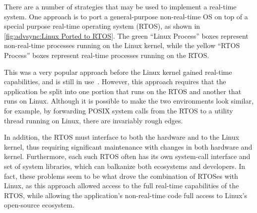 There are a number of strategies that may be used to implement a
real-time system.
One approach is to port a general-purpose non-real-time OS on top
of a special purpose real-time operating system (RTOS), as shown in
\cref{fig:advsync:Linux Ported to RTOS}.
The green ``Linux Process'' boxes represent non-real-time processes
running on the Linux kernel, while the yellow ``RTOS Process''
boxes represent real-time processes running on the RTOS\@.

This was a very popular approach before the Linux kernel gained
real-time capabilities, and is still in
use~\cite{Xenomai2014,VictorYodaiken2004a}.
However, this approach requires that the application be split into
one portion that runs on the RTOS and another that runs on Linux.
Although it is possible to make the two environments look similar,
for example, by forwarding POSIX system calls from the RTOS to a
utility thread running on Linux, there are invariably rough edges.

In addition, the RTOS must interface to both the hardware and to
the Linux kernel, thus requiring significant maintenance with
changes in both hardware and kernel.
Furthermore, each such RTOS often has its own system-call interface
and set of system libraries, which can balkanize both ecosystems and
developers.
In fact, these problems seem to be what drove the combination of
RTOSes with Linux, as this approach allowed access to the full real-time
capabilities of the RTOS, while allowing the application's non-real-time
code full access to Linux's open-source ecosystem.

